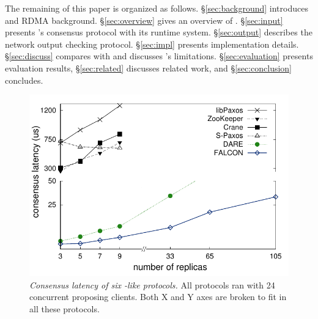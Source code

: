 The remaining of this paper is organized as follows.
\S\ref{sec:background} introduces \paxos and RDMA background.
\S\ref{sec:overview} gives an overview of \xxx. \S\ref{sec:input} presents 
\xxx's consensus protocol with its runtime system. \S\ref{sec:output} describes 
the network output checking protocol. \S\ref{sec:impl} presents implementation 
details. \S\ref{sec:discuss} compares \xxx with \dare and discusses \xxx's 
limitations. \S\ref{sec:evaluation} presents evaluation results, 
\S\ref{sec:related} discusses related work, and \S\ref{sec:conclusion} 
concludes. 

\begin{figure}[t]
\centering
\vspace{-.10in}
\includegraphics[width=.4\textwidth]{figures/traditional_paxos_latency}
\vspace{-.1in}
\caption{{\em Consensus latency of six \paxos-like protocols.} All protocols 
ran with 24 concurrent proposing clients. Both X and Y axes 
are broken to fit in all these protocols.}
\label{fig:scalability}
\vspace{-.25in}
\end{figure}
